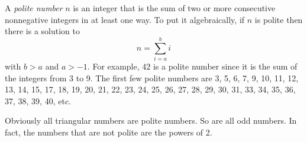 \documentclass[12pt]{article}
\begin{document}
A {\em polite number} $n$ is an integer that is the sum of two or more consecutive nonnegative integers in at least one way. To put it algebraically, if $n$ is polite then there is a solution to $$n = \sum_{i = a}^b i$$ with $b > a$ and $a > -1$. For example, 42 is a polite number since it is the sum of the integers from 3 to 9. The first few polite numbers are 3, 5, 6, 7, 9, 10, 11, 12, 13, 14, 15, 17, 18, 19, 20, 21, 22, 23, 24, 25, 26, 27, 28, 29, 30, 31, 33, 34, 35, 36, 37, 38, 39, 40, etc.

Obviously all triangular numbers are polite numbers. So are all odd numbers. In fact, the numbers that are not polite are the powers of 2.
\end{document}
